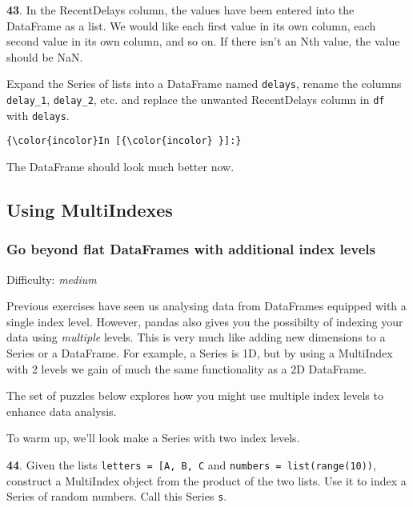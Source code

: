 \documentclass[11pt]{article}
\begin{document}
    \textbf{43}. In the RecentDelays column, the values have been entered
into the DataFrame as a list. We would like each first value in its own
column, each second value in its own column, and so on. If there isn't
an Nth value, the value should be NaN.

Expand the Series of lists into a DataFrame named \texttt{delays},
rename the columns \texttt{delay\_1}, \texttt{delay\_2}, etc. and
replace the unwanted RecentDelays column in \texttt{df} with
\texttt{delays}.

    \begin{Verbatim}[commandchars=\\\{\}]
{\color{incolor}In [{\color{incolor} }]:} 
\end{Verbatim}


    The DataFrame should look much better now.

    \subsection{Using MultiIndexes}\label{using-multiindexes}

\subsubsection{Go beyond flat DataFrames with additional index
levels}\label{go-beyond-flat-dataframes-with-additional-index-levels}

Difficulty: \emph{medium}

Previous exercises have seen us analysing data from DataFrames equipped
with a single index level. However, pandas also gives you the possibilty
of indexing your data using \emph{multiple} levels. This is very much
like adding new dimensions to a Series or a DataFrame. For example, a
Series is 1D, but by using a MultiIndex with 2 levels we gain of much
the same functionality as a 2D DataFrame.

The set of puzzles below explores how you might use multiple index
levels to enhance data analysis.

To warm up, we'll look make a Series with two index levels.

    \textbf{44}. Given the lists
\texttt{letters\ =\ {[}\textquotesingle{}A\textquotesingle{},\ \textquotesingle{}B\textquotesingle{},\ \textquotesingle{}C\textquotesingle{}{]}}
and \texttt{numbers\ =\ list(range(10))}, construct a MultiIndex object
from the product of the two lists. Use it to index a Series of random
numbers. Call this Series \texttt{s}.
\end{document}
